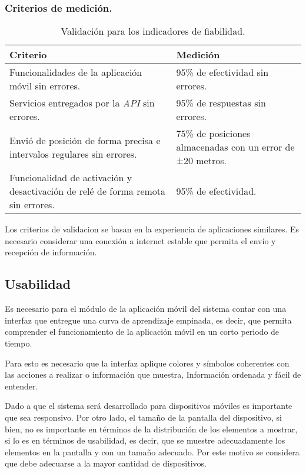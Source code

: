 \subsubsection{Criterios de medición.}

\begin{table}[H]
    \caption[Validación para los indicadores de fiabilidad.] {Validación para los indicadores de fiabilidad.}
    \label{tbl:Criterios de Validación fiabilidad}
    \begin{tabular}{|p{}|p{}|}
        \hline
        \textbf{Criterio} &  \textbf{Medición}\\
    	\hline
    	\hline
    	Funcionalidades de la aplicación móvil sin errores. & 95\% de efectividad sin errores. \\ \hline
		Servicios entregados por la \emph{API} sin errores. & 95\% de respuestas sin errores. \\ \hline
		Envió de posición de forma precisa e intervalos regulares sin errores. & 75\% de posiciones almacenadas con un error de ±20 metros. \\ \hline
		Funcionalidad de activación y desactivación de relé de forma remota sin errores. & 95\% de efectividad. \\
        \hline
    \end{tabular}
\end{table}

Los criterios de validacion se basan en la experiencia de aplicaciones similares. Es necesario considerar una conexión a internet estable que permita el envío y recepción de información.

\subsection{Usabilidad}

Es necesario para el módulo de la aplicación móvil del sistema contar con una interfaz que entregue una curva de aprendizaje empinada, es decir, que permita comprender el funcionamiento de la aplicación móvil en un corto periodo de tiempo.

Para esto es necesario que la interfaz aplique colores y símbolos coherentes con las acciones a realizar o información que muestra, Información ordenada y fácil de entender.

Dado a que el sistema será desarrollado para dispositivos móviles es importante que sea responsivo. Por otro lado, el tamaño de la pantalla del dispositivo, si bien, no es importante en términos de la distribución de los elementos a mostrar, si lo es en términos de usabilidad, es decir, que se muestre adecuadamente los elementos en la pantalla y con un tamaño adecuado. Por este motivo se considera que debe adecuarse a la mayor cantidad de dispositivos.

